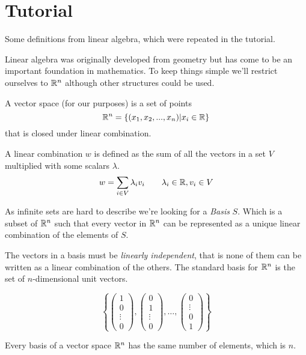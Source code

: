 \section*{Tutorial}
Some definitions from linear algebra, which were repeated in the tutorial.

Linear algebra was originally developed from geometry but has come to be an important foundation in mathematics. To keep things simple we'll restrict ourselves to $\mathbb{R}^n$ although other structures could be used.

\begin{Def} 
A vector space (for our purposes) is a set of points $$\mathbb{R}^n=\{(x_1,x_2,...,x_n)|x_i \in \mathbb{R}\}$$ that is closed under linear combination.
\end{Def}

\begin{Def} 
A linear combination $w$ is defined as the sum of all the vectors in a set $V$ multiplied with some scalars $\lambda$.
$$w=\sum_{i \in V}{\lambda_i v_i} \qquad \lambda_i \in \mathbb{R},v_i\in V$$ 
\end{Def}  

As infinite sets are hard to describe we're looking for a \emph{Basis} $S$. Which is a subset of $\mathbb{R}^n$ such that every vector in $\mathbb{R}^n$ can be represented as a unique linear combination of the elements of $S$.

The vectors in a basis must be \emph{linearly independent}, that is none of them can be written as a linear combination of the others. The standard basis for $\mathbb{R}^n$ is the set of $n$-dimensional unit vectors.

\[\left\{\begin{pmatrix}1\\0\\\vdots\\0\end{pmatrix},\begin{pmatrix}0\\1\\\vdots\\0\end{pmatrix},\ldots,\begin{pmatrix}0\\\vdots\\0\\1\end{pmatrix}\right\}\]


\begin{thm} 
Every basis of a vector space $\mathbb{R}^n$ has the same number of elements, which is $n$. 
\end{thm}

